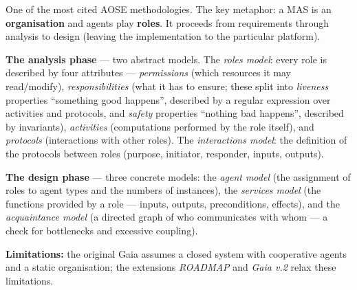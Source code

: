 \documentclass[11pt,a4paper]{article}
\theoremstyle{definition}
\providecommand{\uv}[1]{``#1''}
\begin{document}
\begin{defbox}
One of the most cited AOSE methodologies. The key metaphor: a MAS is an \textbf{organisation} and
agents play \textbf{roles}. It proceeds from requirements through analysis to design (leaving the
implementation to the particular platform).

\textbf{The analysis phase} --- two abstract models. The \emph{roles model}: every
role is described by four attributes --- \emph{permissions} (which resources it may read/modify),
\emph{responsibilities} (what it has to ensure; these split into \emph{liveness} properties
\uv{something good happens}, described by a regular expression over activities and protocols, and
\emph{safety} properties \uv{nothing bad happens}, described by invariants), \emph{activities}
(computations performed by the role itself), and \emph{protocols} (interactions with other roles). The
\emph{interactions model}: the definition of the protocols between roles (purpose, initiator,
responder, inputs, outputs).

\textbf{The design phase} --- three concrete models: the \emph{agent model} (the assignment of roles to
agent types and the numbers of instances), the \emph{services model} (the functions provided by a role
--- inputs, outputs, preconditions, effects), and the \emph{acquaintance model} (a directed graph of who
communicates with whom --- a check for bottlenecks and excessive coupling).

\textbf{Limitations:} the original Gaia assumes a closed system with cooperative agents and a static
organisation; the extensions \emph{ROADMAP} and \emph{Gaia v.2} relax these limitations.
\end{defbox}
\end{document}
